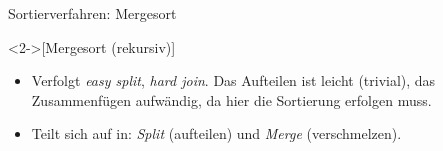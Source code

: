 \begin{frame}{Sortierverfahren: Mergesort}
    \begin{definition}<2->[Mergesort \hfill{}(rekursiv)]
    \end{definition}
    \begin{itemize}
        \item<5-> Verfolgt \emph{easy split}, \emph{hard join}. Das Aufteilen ist leicht (trivial), das Zusammenfügen aufwändig, da hier die Sortierung erfolgen muss.
        \item<6-> Teilt sich auf in: \emph{Split} (aufteilen) und \emph{Merge} (verschmelzen).
    \end{itemize}
    \vfill
    \begin{center}
    \end{center}
\end{frame}


